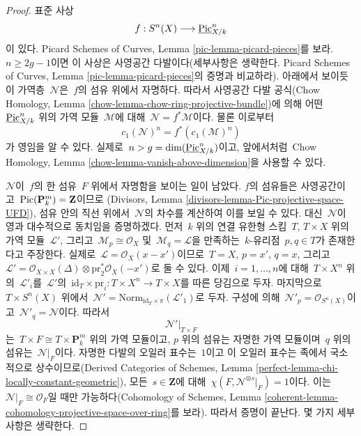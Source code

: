 \begin{proof}
\medskip\noindent
표준 사상
$$
f : S^n(X) \longrightarrow \underline{\mathrm{Pic}}^n_{X/k}
$$
이 있다. Picard Schemes of Curves, Lemma
\ref{pic-lemma-picard-pieces}를 보라. $n \geq 2g - 1$이면 이 사상은
사영공간 다발이다(세부사항은 생략한다. Picard Schemes of Curves,
Lemma \ref{pic-lemma-picard-pieces}의 증명과 비교하라).
아래에서 보이듯이 가역층\  $\mathcal{N}$은\  $f$의 섬유 위에서 자명하다.
따라서 사영공간 다발 공식(Chow Homology, Lemma
\ref{chow-lemma-chow-ring-projective-bundle})에 의해 어떤\ 
$\underline{\mathrm{Pic}}^n_{X/k}$ 위의 가역 모듈\  $\mathcal{M}$에 대해\ 
$\mathcal{N} = f^*\mathcal{M}$이다. 물론 이로부터
$$
c_1(\mathcal{N})^n = f^*(c_1(\mathcal{M})^n)
$$
가 영임을 알 수 있다. 실제로\ 
$n > g = \dim(\underline{\mathrm{Pic}}^n_{X/k})$이고, 앞에서처럼\ 
Chow Homology, Lemma \ref{chow-lemma-vanish-above-dimension}을
사용할 수 있다.

\medskip\noindent
$\mathcal{N}$이\  $f$의 한 섬유\  $F$ 위에서 자명함을 보이는 일이 남았다.
$f$의 섬유들은 사영공간이고\  $\mathop{\mathrm{Pic}}\nolimits(\mathbf{P}^m_k) = \mathbf{Z}$이므로
(Divisors, Lemma \ref{divisors-lemma-Pic-projective-space-UFD}),
섬유 안의 직선 위에서\  $\mathcal{N}$의 차수를 계산하여 이를 보일 수 있다.
대신\  $\mathcal{N}$이 영과 대수적으로 동치임을 증명하겠다. 먼저\ 
$k$ 위의 연결 유한형 스킴\  $T$, $T \times X$ 위의 가역 모듈\ 
$\mathcal{L}'$, 그리고\  $\mathcal{M}_p \cong \mathcal{O}_X$ 및\ 
$\mathcal{M}_q = \mathcal{L}$을 만족하는\  $k$-유리점\  $p, q \in T$가
존재한다고 주장한다. 실제로\  $\mathcal{L} = \mathcal{O}_X(x - x')$이므로\ 
$T = X$, $p = x'$, $q = x$, 그리고\ 
$\mathcal{L}' = \mathcal{O}_{X \times X}(\Delta)
\otimes \text{pr}_2^*\mathcal{O}_X(-x')$로 둘 수 있다.
이제\  $i = 1, \ldots, n$에 대해\  $T \times X^n$ 위의\ 
$\mathcal{L}'_i$를\  $\mathcal{L}'$의\ 
$\text{id}_T \times \text{pr}_i : T \times X^n \to T \times X$를
따른 당김으로 두자. 마지막으로\  $T \times S^n(X)$ 위에서\ 
$\mathcal{N}' = \text{Norm}_{\text{id}_T \times \pi}(\mathcal{L}'_1)$로
두자. 구성에 의해\  $\mathcal{N}'_p = \mathcal{O}_{S^n(X)}$이고\ 
$\mathcal{N}'_q = \mathcal{N}$이다. 따라서
$$
\mathcal{N}'|_{T \times F}
$$
는\  $T \times F \cong T \times \mathbf{P}^m_k$ 위의 가역 모듈이고,
$p$ 위의 섬유는 자명한 가역 모듈이며\  $q$ 위의 섬유는\ 
$\mathcal{N}|_F$이다. 자명한 다발의 오일러 표수는\  $1$이고 이 오일러
표수는 족에서 국소적으로 상수이므로(Derived Categories of Schemes,
Lemma \ref{perfect-lemma-chi-locally-constant-geometric}), 모든\ 
$s \in \mathbf{Z}$에 대해\  $\chi(F, \mathcal{N}^{\otimes s}|_F) = 1$이다.
이는\  $\mathcal{N}|_F \cong \mathcal{O}_F$일 때만 가능하다(Cohomology of
Schemes, Lemma
\ref{coherent-lemma-cohomology-projective-space-over-ring}를 보라).
따라서 증명이 끝난다. 몇 가지 세부사항은 생략한다.
\end{proof}















